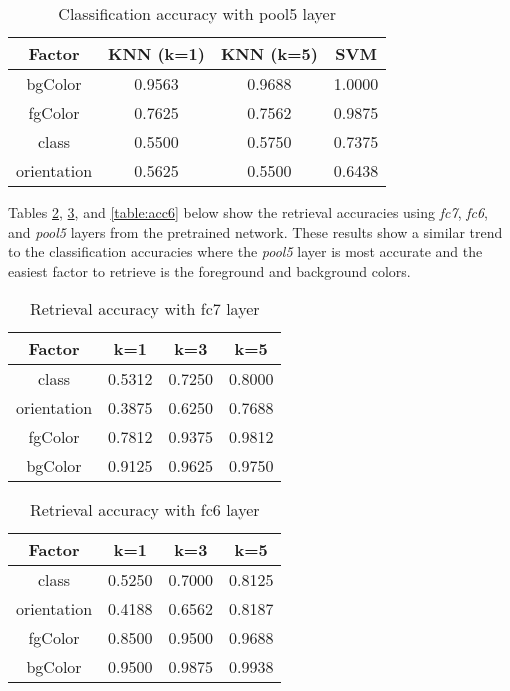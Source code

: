 \documentclass[twoside,10pt]{article}
\begin{document}
\begin{table}[h!]
\centering
\begin{tabular}{c|ccc}
Factor & KNN (k=1) & KNN (k=5) & SVM\\
\hline
bgColor & 0.9563 & 0.9688 & 1.0000\\
fgColor & 0.7625 & 0.7562 & 0.9875\\
class & 0.5500 & 0.5750 & 0.7375\\
orientation & 0.5625 & 0.5500 & 0.6438\\
\end{tabular}
\caption{Classification accuracy with pool5 layer\label{table:acc3}}
\end{table}

Tables \ref{table:acc4}, \ref{table:acc5}, and \ref{table:acc6} below show the retrieval accuracies using \textit{fc7}, \textit{fc6}, and \textit{pool5} layers 
from the pretrained network. These results show a similar trend to the classification accuracies where the \textit{pool5} layer is most accurate
and the easiest factor to retrieve is the foreground and background colors.

\begin{table}[h!]
\centering
\begin{tabular}{c|ccc}
Factor & k=1 & k=3 & k=5\\
\hline
class & 0.5312 & 0.7250 & 0.8000\\
orientation & 0.3875 & 0.6250 & 0.7688\\
fgColor & 0.7812 & 0.9375 & 0.9812\\
bgColor & 0.9125 & 0.9625 & 0.9750\\
\end{tabular}
\caption{Retrieval accuracy with fc7 layer\label{table:acc4}}
\end{table}

\begin{table}[h!]
\centering
\begin{tabular}{c|ccc}
Factor & k=1 & k=3 & k=5\\
\hline
class & 0.5250 & 0.7000 & 0.8125\\
orientation & 0.4188 & 0.6562 & 0.8187\\
fgColor & 0.8500 & 0.9500 & 0.9688\\
bgColor & 0.9500 & 0.9875 & 0.9938\\
\end{tabular}
\caption{Retrieval accuracy with fc6 layer\label{table:acc5}}
\end{table}
\end{document}
